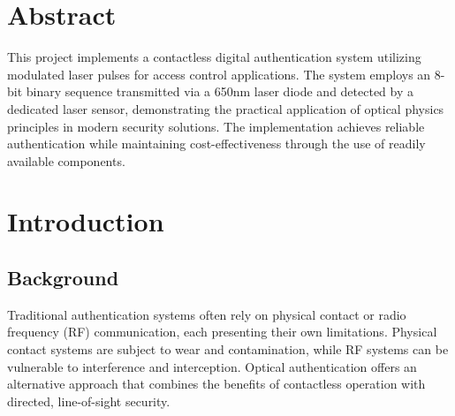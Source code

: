\documentclass[12pt,a4paper]{article}
\begin{document}
\begin{titlepage}
\thispagestyle{empty}

\newlength{\boxwidth}
\setlength{\boxwidth}{\textwidth}
\addtolength{\boxwidth}{-4mm}\setlength{\fboxrule}{2pt}

\newlength{\boxheight}
\setlength{\boxheight}{\textheight}
\addtolength{\boxheight}{1.9cm}

\centering
\vspace*{-2.5cm}
\end{titlepage}

\tableofcontents
\newpage

\section*{Abstract}
This project implements a contactless digital authentication system utilizing modulated laser pulses for access control applications. The system employs an 8-bit binary sequence transmitted via a 650nm laser diode and detected by a dedicated laser sensor, demonstrating the practical application of optical physics principles in modern security solutions. The implementation achieves reliable authentication while maintaining cost-effectiveness through the use of readily available components.

\section{Introduction}
\subsection{Background}
Traditional authentication systems often rely on physical contact or radio frequency (RF) communication, each presenting their own limitations. Physical contact systems are subject to wear and contamination, while RF systems can be vulnerable to interference and interception. Optical authentication offers an alternative approach that combines the benefits of contactless operation with directed, line-of-sight security.
\end{document}
